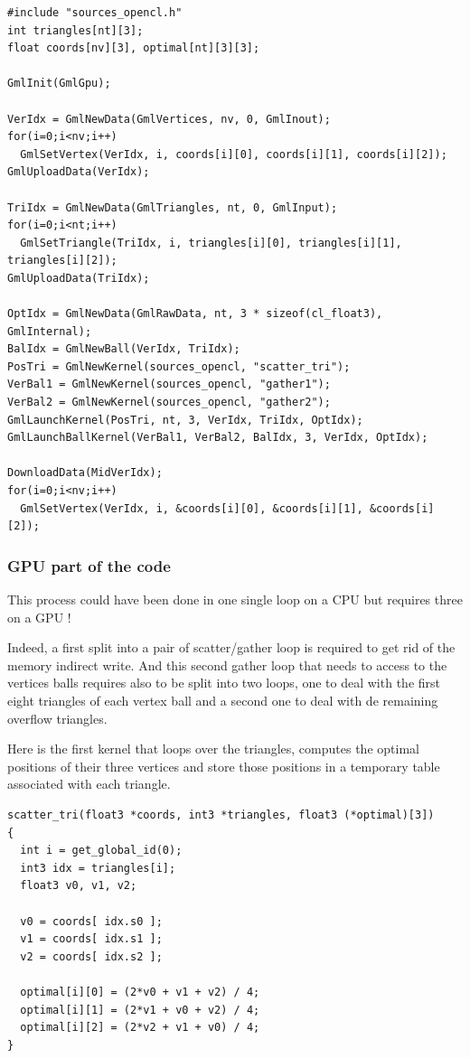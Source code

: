 \documentclass[a4paper,12pt]{article}
\begin{document}
\begin{tt}
\begin{verbatim}
#include "sources_opencl.h"
int triangles[nt][3];
float coords[nv][3], optimal[nt][3][3];

GmlInit(GmlGpu);

VerIdx = GmlNewData(GmlVertices, nv, 0, GmlInout);
for(i=0;i<nv;i++)
  GmlSetVertex(VerIdx, i, coords[i][0], coords[i][1], coords[i][2]);
GmlUploadData(VerIdx);

TriIdx = GmlNewData(GmlTriangles, nt, 0, GmlInput);
for(i=0;i<nt;i++)
  GmlSetTriangle(TriIdx, i, triangles[i][0], triangles[i][1], triangles[i][2]);
GmlUploadData(TriIdx);

OptIdx = GmlNewData(GmlRawData, nt, 3 * sizeof(cl_float3), GmlInternal);
BalIdx = GmlNewBall(VerIdx, TriIdx);
PosTri = GmlNewKernel(sources_opencl, "scatter_tri");
VerBal1 = GmlNewKernel(sources_opencl, "gather1");
VerBal2 = GmlNewKernel(sources_opencl, "gather2");
GmlLaunchKernel(PosTri, nt, 3, VerIdx, TriIdx, OptIdx);
GmlLaunchBallKernel(VerBal1, VerBal2, BalIdx, 3, VerIdx, OptIdx);

DownloadData(MidVerIdx);
for(i=0;i<nv;i++)
  GmlSetVertex(VerIdx, i, &coords[i][0], &coords[i][1], &coords[i][2]);
\end{verbatim}
\end{tt}
\normalfont


\subsubsection{GPU part of the code}
This process could have been done in one single loop on a CPU but requires three on a GPU !

Indeed, a first split into a pair of scatter/gather loop is required to get rid of the memory indirect write. And this second gather loop that needs to access to the vertices balls requires also to be split into two loops, one to deal with the first eight triangles of each vertex ball and a second one to deal with de remaining overflow triangles.

Here is the first kernel that loops over the triangles, computes the optimal positions of their three vertices and store those positions in a temporary table associated with each triangle.


\begin{tt}
\begin{verbatim}
scatter_tri(float3 *coords, int3 *triangles, float3 (*optimal)[3])
{
  int i = get_global_id(0);
  int3 idx = triangles[i];
  float3 v0, v1, v2;

  v0 = coords[ idx.s0 ];
  v1 = coords[ idx.s1 ];
  v2 = coords[ idx.s2 ];

  optimal[i][0] = (2*v0 + v1 + v2) / 4;
  optimal[i][1] = (2*v1 + v0 + v2) / 4;
  optimal[i][2] = (2*v2 + v1 + v0) / 4;
}
\end{verbatim}
\end{tt}
\normalfont
\end{document}
